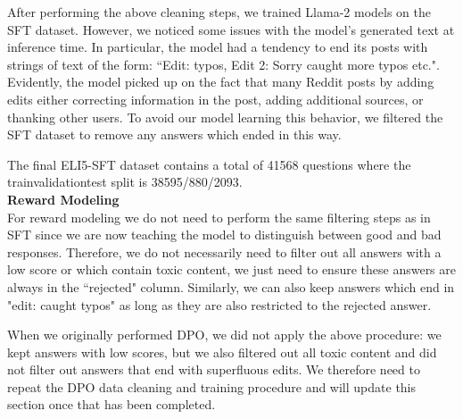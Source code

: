 \documentclass[11pt, oneside]{article}   	%
\begin{document}
After performing the above cleaning steps, we trained Llama-2 models on the SFT dataset.
However, we noticed some issues with the model's generated text at inference time.
In particular, the model had a tendency to end its posts with strings of text of the form: ``Edit: typos, Edit 2: Sorry caught more typos etc.". 
Evidently, the model picked up on the fact that many Reddit posts by adding edits either correcting information in the post, adding additional sources, or thanking other users.
To avoid our model learning this behavior, we filtered the SFT dataset to remove any answers which ended in this way. 

The final ELI5-SFT dataset contains a total of 41568 questions where the train\/validation\/test split is 38595/880/2093. 
\\[10pt]
{\large \textbf{Reward Modeling}}
\\[10pt]
For reward modeling we do not need to perform the same filtering steps as in SFT since we are now teaching the model to distinguish between good and bad responses.
Therefore, we do not necessarily need to filter out all answers with a low score or which contain toxic content, we just need to ensure these answers are always in the ``rejected" column. 
Similarly, we can also keep answers which end in "edit: caught typos" as long as they are also restricted to the rejected answer.

When we originally performed DPO, we did not apply the above procedure: we kept answers with low scores, but we also filtered out all toxic content and did not filter out answers that end with superfluous edits. 
We therefore need to repeat the DPO data cleaning and training procedure and will update this section once that has been completed.
\end{document}

